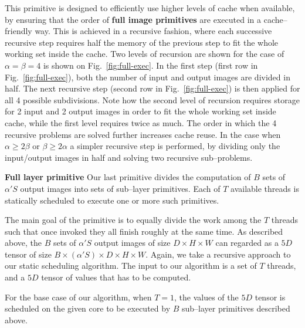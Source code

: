   This primitive is designed to efficiently use higher levels of cache
  when available, by ensuring that the order of {\bf full image
    primitives} are executed in a cache--friendly way.  This is
  achieved in a recursive fashion, where each successive recursive
  step requires half the memory of the previous step to fit the whole
  working set inside the cache.  Two levels of recursion are shown for
  the case of $\alpha = \beta = 4$ is shown on
  Fig.~\ref{fig:full-exec}.  In the first step (first row in
  Fig.~\ref{fig:full-exec}), both the number of input and output
  images are divided in half.  The next recursive step (second row in
  Fig.~\ref{fig:full-exec}) is then applied for all 4 possible
  subdivisions.  Note how the second level of recursion requires
  storage for 2 input and 2 output images in order to fit the whole
  working set inside cache, while the first level requires twice as
  much.  The order in which the 4 recursive problems are solved
  further increases cache reuse.  In the case when $\alpha \ge 2\beta$
  or $\beta \ge 2\alpha$ a simpler recursive step is performed, by
  dividing only the input/output images in half and solving two
  recursive sub--problems.

  {\bf Full layer primitive} \quad Our last primitive divides the
  computation of $B$ sets of $\alpha' S$ output images into sets of
  sub--layer primitives.  Each of $T$ available threads is statically
  scheduled to execute one or more such primitives.

  The main goal of the primitive is to equally divide the work among
  the $T$ threads such that once invoked they all finish roughly at
  the same time.  As described above, the $B$ sets of $\alpha'S$
  output images of size $D \times H \times W$ can regarded as a $5D$
  tensor of size $B \times (\alpha'S) \times D \times H \times W$.
  Again, we take a recursive approach to our static scheduling
  algorithm.  The input to our algorithm is a set of $T$ threads, and
  a $5D$ tensor of values that has to be computed.

  For the base case of our algorithm, when $T=1$, the values of the
  $5D$ tensor is scheduled on the given core to be executed by $B$
  sub--layer primitives described above.

